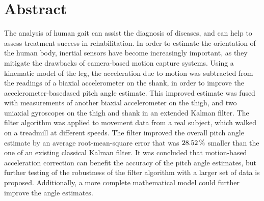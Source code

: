 \chapter{Abstract}

The analysis of human gait can assist the diagnosis of diseases, and can help to assess treatment success in rehabilitation. In order to estimate the orientation of the human body, inertial sensors have become increasingly important, as they mitigate the drawbacks of camera-based motion capture systems. Using a kinematic model of the leg, the acceleration due to motion was subtracted from the readings of a biaxial accelerometer on the shank, in order to improve the accelerometer-basedased pitch angle estimate. This improved estimate was fused with measurements of another biaxial accelerometer on the thigh, and two uniaxial gyroscopes on the thigh and shank in an extended Kalman filter. The filter algorithm was applied to movement data from a real subject, which walked on a treadmill at different speeds. The filter improved the overall pitch angle estimate by an average root-mean-square error that was $\unit[28.52]{\%}$ smaller than the one of an existing classical Kalman filter. It was concluded that motion-based acceleration correction can benefit the accuracy of the pitch angle estimates, but further testing of the robustness of the filter algorithm with a larger set of data is proposed. Additionally, a more complete mathematical model could further improve the angle estimates.
